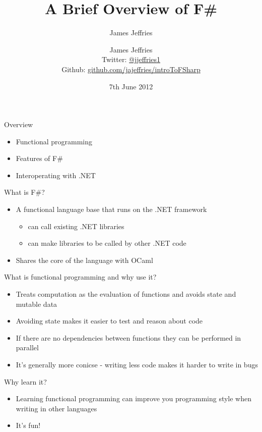 \documentclass[landscape]{slides}
\author{James Jeffries}
\author{\parbox{.5\textwidth}{\centering
  James Jeffries \\
  \small Twitter: \href{http://www.twitter.com/jjeffries1}{@jjeffries1} \\[3pt]
  Github: \href{https://github.com/jajeffries/introToFSharp}{github.com/jajeffries/introToFSharp}}}
\title{A Brief Overview of F\#}
\date{7th June 2012}
\begin{document}
\begin{slide}
\maketitle
\end{slide}

\begin{slide}{Overview}
\begin{itemize}
\item Functional programming 
\item Features of F\#
\item Interoperating with .NET
\end{itemize}
\end{slide}

\begin{slide}{What is F\#?}
\begin{itemize}
\item A functional language base that runs on the .NET framework
\begin{itemize}
\item can call existing .NET libraries
\item can make libraries to be called by other .NET code
\end{itemize}
\item Shares the core of the language with OCaml
\end{itemize}
\end{slide}

\begin{slide}{What is functional programming and why use it?}
\begin{itemize}
\item Treats computation as the evaluation of functions and avoids state and mutable data
\item Avoiding state makes it easier to test and reason about code
\item If there are no dependencies between functions they can be performed in parallel
\item It's generally more conicse - writing less code makes it harder to write in bugs
\end{itemize}
\end{slide}

\begin{slide}{Why learn it?}
\begin{itemize}
\item Learning functional programming can improve you programming style when writing in other languages
\item It's fun!
\end{itemize}
\end{slide}
\end{document}
